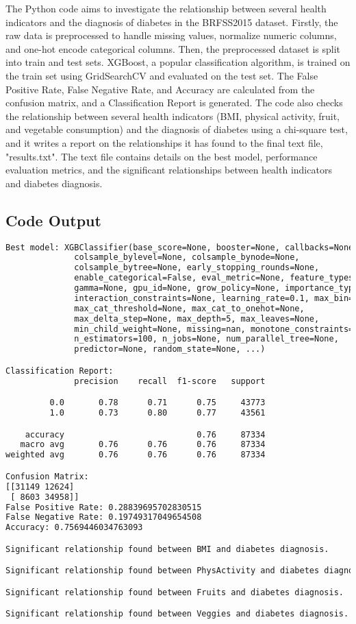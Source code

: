 \documentclass[12pt]{article}
\begin{document}
The Python code aims to investigate the relationship between several health indicators and the diagnosis of diabetes in the BRFSS2015 dataset. Firstly, the raw data is preprocessed to handle missing values, normalize numeric columns, and one-hot encode categorical columns. Then, the preprocessed dataset is split into train and test sets. XGBoost, a popular classification algorithm, is trained on the train set using GridSearchCV and evaluated on the test set. The False Positive Rate, False Negative Rate, and Accuracy are calculated from the confusion matrix, and a Classification Report is generated. The code also checks the relationship between several health indicators (BMI, physical activity, fruit, and vegetable consumption) and the diagnosis of diabetes using a chi-square test, and it writes a report on the relationships it has found to the final text file, "results.txt". The text file contains details on the best model, performance evaluation metrics, and the significant relationships between health indicators and diabetes diagnosis.

\subsection{Code Output}

\begin{lstlisting}[language=TeX]
Best model: XGBClassifier(base_score=None, booster=None, callbacks=None,
              colsample_bylevel=None, colsample_bynode=None,
              colsample_bytree=None, early_stopping_rounds=None,
              enable_categorical=False, eval_metric=None, feature_types=None,
              gamma=None, gpu_id=None, grow_policy=None, importance_type=None,
              interaction_constraints=None, learning_rate=0.1, max_bin=None,
              max_cat_threshold=None, max_cat_to_onehot=None,
              max_delta_step=None, max_depth=5, max_leaves=None,
              min_child_weight=None, missing=nan, monotone_constraints=None,
              n_estimators=100, n_jobs=None, num_parallel_tree=None,
              predictor=None, random_state=None, ...)

Classification Report:
              precision    recall  f1-score   support

         0.0       0.78      0.71      0.75     43773
         1.0       0.73      0.80      0.77     43561

    accuracy                           0.76     87334
   macro avg       0.76      0.76      0.76     87334
weighted avg       0.76      0.76      0.76     87334

Confusion Matrix: 
[[31149 12624]
 [ 8603 34958]]
False Positive Rate: 0.28839695702830515
False Negative Rate: 0.19749317049654508
Accuracy: 0.7569446034763093

Significant relationship found between BMI and diabetes diagnosis.

Significant relationship found between PhysActivity and diabetes diagnosis.

Significant relationship found between Fruits and diabetes diagnosis.

Significant relationship found between Veggies and diabetes diagnosis.


\end{lstlisting}
\end{document}

